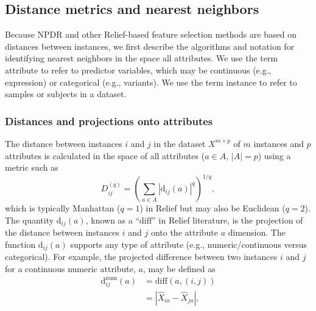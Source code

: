 \documentclass{bioinfo}
\begin{document}
\subsection{Distance metrics and nearest neighbors}\label{sec:reform}
Because NPDR and other Relief-based feature selection methods are based on distances between instances, we first describe the algorithms and notation for identifying nearest neighbors in the space all attributes.
We use the term attribute to refer to predictor variables, which may be continuous (e.g., expression) or categorical (e.g., variants).
We use the term instance to refer to samples or subjects in a dataset.

\subsubsection{Distances and projections onto attributes}
The distance between instances $i$ and $j$ in the dataset $X^{m \times p}$ of $m$ instances and $p$ attributes is calculated in the space of all attributes ($a \in A$, $|A|=p$) using a metric such as
\begin{equation}\label{eq:D}
D^{(q)}_{ij}=\left(\sum_{a\in A}|\text{d}_{ij}(a)|^q\right)^{1/q},
\end{equation}
which is typically Manhattan ($q=1$) in Relief but may also be Euclidean ($q=2$).
The quantity 
$\text{d}_{ij}(a)$,
known as a ``$\text{diff}$'' in Relief literature, is the projection of the distance between instances $i$ and $j$ onto the attribute $a$ dimension.
The function $\text{d}_{ij}(a)$ supports any type of attribute (e.g., numeric/continuous versus categorical).
For example, the projected difference between two instances $i$ and $j$ for a continuous numeric attribute, $a$, may be defined as
\begin{equation}\label{eq:diff}
\begin{aligned}
\text{d}^{\text{num}}_{ij}(a)&=\text{diff}(a,(i,j))\\
                                            & = {|\hat{X}_{ia}-\hat{X}_{ja}|},
\end{aligned}
\end{equation}
\end{document}
